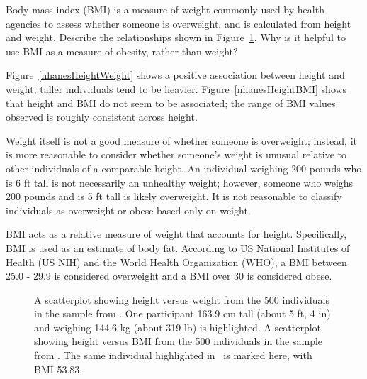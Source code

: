 \begin{examplewrap}
\begin{nexample}{Body mass index (BMI) is a measure of weight commonly used by health agencies to assess whether someone is overweight, and is calculated from height and weight.\footnotemark{} Describe the relationships shown in Figure~\ref{nhanesHeightWeightBmi}. Why is it helpful to use BMI as a measure of obesity, rather than weight?} 
\label{ex:nhanesHeightWeightBmi}

Figure~\ref{nhanesHeightWeight}	shows a positive association between height and weight; taller individuals tend to be heavier. Figure~\ref{nhanesHeightBMI} shows that height and BMI do not seem to be associated; the range of BMI values observed is roughly consistent across height. 

Weight itself is not a good measure of whether someone is overweight; instead, it is more reasonable to consider whether someone's weight is unusual relative to other individuals of a comparable height. An individual weighing 200 pounds who is 6 ft tall is not necessarily an unhealthy weight; however, someone who weighs 200 pounds and is 5 ft tall is likely overweight. It is not reasonable to classify individuals as overweight or obese based only on weight.

BMI acts as a relative measure of weight that accounts for height. Specifically, BMI is used as an estimate of body fat. According to US National Institutes of Health (US NIH) and the World Health Organization (WHO), a BMI between 25.0 - 29.9 is considered overweight and a BMI over 30 is considered obese.\footnotemark{}
\end{nexample}
\end{examplewrap}
\addtocounter{footnote}{-1}%
%
\addtocounter{footnote}{1}%

\begin{figure}[h]
	\centering
    \caption{ A scatterplot showing height versus weight from the 500 individuals in the sample from . One participant 163.9 cm tall (about 5 ft, 4 in) and weighing 144.6 kg (about 319 lb) is highlighted.  A scatterplot showing height versus BMI from the 500 individuals in the sample from . The same individual highlighted in~ is marked here, with BMI 53.83.}\label{nhanesHeightWeightBmi} 
\end{figure}

